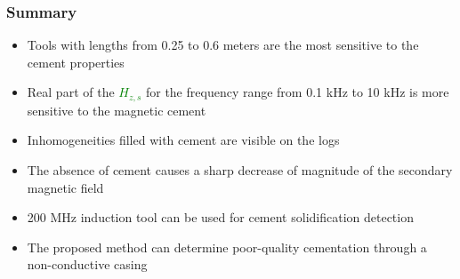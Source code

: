 \documentclass[aspectratio=169]{beamer}
\begin{document}

\begin{frame}
\frametitle{Summary}
\begin{itemize}
\item Tools with lengths from 0.25 to 0.6 meters are the most sensitive to the cement properties 
\item Real part of the \textcolor{green}{$H_{z,s}$} for the frequency range from 0.1 kHz to 10 kHz is more sensitive to the magnetic cement
\item Inhomogeneities filled with cement are visible on the logs
\item The absence of cement causes a sharp decrease of magnitude of the secondary magnetic field
\item 200 MHz induction tool can be used for cement solidification detection
\item The proposed method can determine poor-quality cementation through a non-conductive casing
\end{itemize}
\end{frame}
%
%
\end{document}
